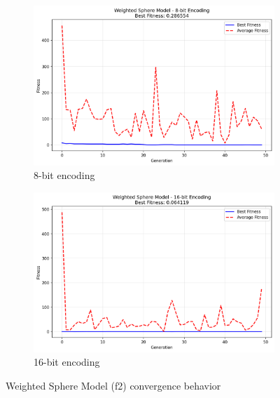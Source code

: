 \documentclass[journal,12pt,onecolumn]{IEEEtran}
\begin{document}
\begin{figure}[H]
\centering
\begin{subfigure}{0.48\textwidth}
    \includegraphics[width=\textwidth]{f2_8bit_fitness.png}
    \caption{8-bit encoding}
\end{subfigure}
\begin{subfigure}{0.48\textwidth}
    \includegraphics[width=\textwidth]{f2_16bit_fitness.png}
    \caption{16-bit encoding}
\end{subfigure}
\caption{Weighted Sphere Model (f2) convergence behavior}
\label{fig:f2}
\end{figure}
\end{document}
